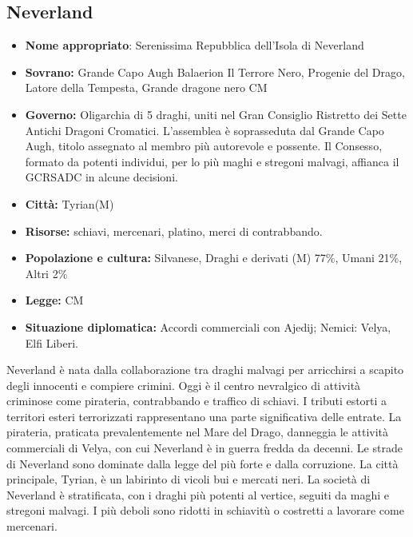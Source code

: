 \documentclass[10pt, a4paper]{report}
\begin{document}
\begin{multicols}{2}
\subsection*{Neverland}
\begin{itemize}
	\item \textbf{Nome appropriato}: Serenissima Repubblica dell'Isola di Neverland
	\item \textbf{Sovrano:} Grande Capo Augh Balaerion Il Terrore Nero, Progenie del Drago, Latore della Tempesta, Grande dragone nero CM
	\item \textbf{Governo:} Oligarchia di 5 draghi, uniti nel Gran Consiglio Ristretto dei Sette Antichi Dragoni Cromatici. L'assemblea è soprasseduta dal Grande Capo Augh, titolo assegnato al membro più autorevole e possente. Il Consesso, formato da potenti individui, per lo più maghi e stregoni malvagi, affianca il GCRSADC in alcune decisioni.
	\item \textbf{Città:} Tyrian(M)
	\item \textbf{Risorse:} schiavi, mercenari, platino, merci di contrabbando.
	\item \textbf{Popolazione e cultura:} Silvanese, Draghi e derivati (M) 77\%, Umani 21\%, Altri 2\%
	\item \textbf{Legge:} CM
	\item \textbf{Situazione diplomatica:} Accordi commerciali con Ajedij; Nemici: Velya, Elfi Liberi.
\end{itemize}
Neverland è nata dalla collaborazione tra draghi malvagi per arricchirsi a scapito degli innocenti e compiere crimini. Oggi è il centro nevralgico di attività criminose come pirateria, contrabbando e traffico di schiavi. I tributi estorti a territori esteri terrorizzati rappresentano una parte significativa delle entrate. La pirateria, praticata prevalentemente nel Mare del Drago, danneggia le attività commerciali di Velya, con cui Neverland è in guerra fredda da decenni.
Le strade di Neverland sono dominate dalla legge del più forte e dalla corruzione. La città principale, Tyrian, è un labirinto di vicoli bui e mercati neri.
La società di Neverland è stratificata, con i draghi più potenti al vertice, seguiti da maghi e stregoni malvagi. I più deboli sono ridotti in schiavitù o costretti a lavorare come mercenari.



\end{multicols}
\end{document}
